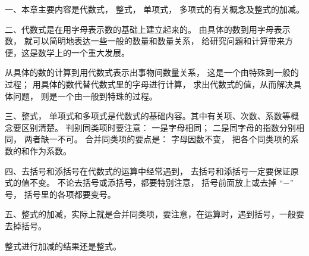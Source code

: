 \xiaojie

一、本章主要内容是代数式， 整式， 单项式， 多项式的有关概念及整式的加减。

二、代数式是在用字母表示数的基础上建立起来的。
由具体的数到用字母表示数， 就可以简明地表达一些一般的数量和数量关系，
给研究问題和计算带来方便，这是数学上的一个重大发展。

从具体的数的计算到用代数式表示出事物间数量关系， 这是一个由特殊到一般的过程；
用具体的数代替代数式里的字母进行计算， 求出代数式的值，从而解决具体问题， 则是一个由一般到特珠的过程。

三、整式， 单项式和多项式是代数式的基础内容。其中有关项、次数、系数等概念要区别清楚。
判别同类项时要注意： 一是字母相同； 二是同字母的指数分别相同， 两者缺一不可。
合并同类项的要点是： 字母因数不变， 把各个同类项的系数的和作为系数。

四、去括号和添括号在代数式的运算中经常遇到， 去括号和添括号一定要保证原式的值不变。
不论去括号或添括号，都要特别注意， 括号前面放上或去掉 “$-$” 号， 括号里的各项都要变号。

五、整式的加减，实际上就是合并同类项，要注意，在运算时，遇到括号，一般要去掉括号。

整式进行加减的结果还是整式。

